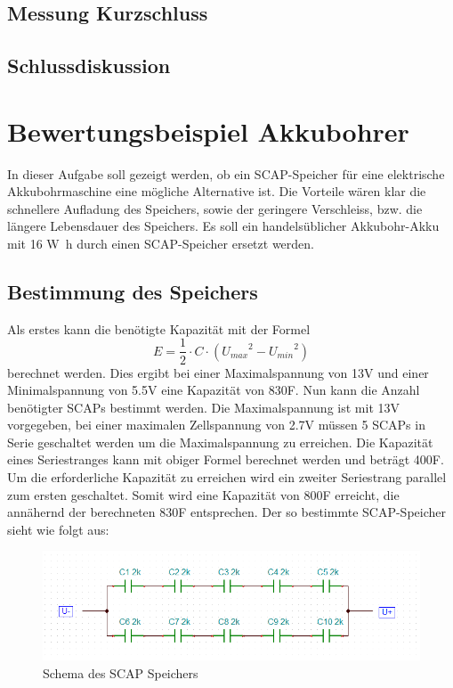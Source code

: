 \documentclass[a4,paper,fleqn]{article}
\begin{document}
\subsection{Messung Kurzschluss}
\subsection{Schlussdiskussion}

\section{Bewertungsbeispiel Akkubohrer}
In dieser Aufgabe soll gezeigt werden, ob ein SCAP-Speicher für eine 
elektrische Akkubohrmaschine eine mögliche Alternative ist. Die Vorteile wären 
klar die schnellere Aufladung des Speichers, sowie der geringere Verschleiss, 
bzw. die längere Lebensdauer des Speichers. Es soll ein handelsüblicher 
Akkubohr-Akku mit 16 \si{\watt\hour} durch einen SCAP-Speicher ersetzt werden.

\subsection{Bestimmung des Speichers}
Als erstes kann die benötigte Kapazität mit der Formel 
\[ E=\frac{1}{2} \cdot C \cdot \left({U_{max}}^2-{U_{min}}^2\right) \]
berechnet werden. Dies ergibt bei einer Maximalspannung von 13\si{\volt} und 
einer Minimalspannung von 5.5\si{\volt} eine Kapazität von 830\si{\farad}. Nun 
kann die Anzahl benötigter SCAPs bestimmt werden. Die Maximalspannung ist mit 
13\si{\volt} vorgegeben, bei einer maximalen Zellspannung von 2.7\si{\volt} 
müssen 5 SCAPs in Serie geschaltet werden um die Maximalspannung zu erreichen. 
Die Kapazität eines Seriestranges kann mit obiger Formel berechnet werden und 
beträgt 400\si{\farad}. Um die erforderliche Kapazität zu erreichen wird ein 
zweiter Seriestrang parallel zum ersten geschaltet. Somit wird eine Kapazität 
von 800\si{\farad} erreicht, die annähernd der berechneten 830\si{\farad} 
entsprechen.
Der so bestimmte SCAP-Speicher sieht wie folgt aus:
\begin{figure}
    \centering
    \includegraphics[width=\textwidth]{fig/schema.png}
    \caption{Schema des SCAP Speichers}
    \label{fig:schematic}
\end{figure}
\end{document}

